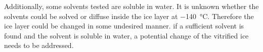 Additionally, some solvents tested are soluble in water. It is unknown whether the solvents could be solved or diffuse inside the ice layer at \SI{-140}{\degreeCelsius}. Therefore the ice layer could be changed in some undesired manner. if a sufficient solvent is found and the solvent is soluble in water, a potential change of the vitrified ice needs to be addressed.
